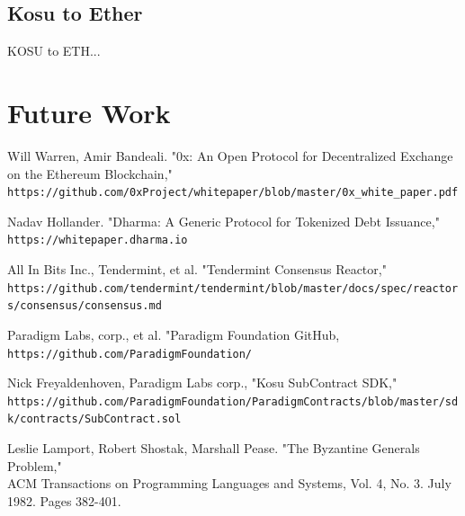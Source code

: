 \documentclass[10pt]{article}
\begin{document}
\subsection{Kosu to Ether}\label{token-distribution-kosu-eth}
KOSU to ETH...\cite{bft}
\clearpage
\pagebreak


\section{Future Work}\label{future-work}

\clearpage
\pagebreak


\begin{thebibliography}{9}

Will Warren, Amir Bandeali. "0x: An Open Protocol for Decentralized Exchange on the Ethereum Blockchain,"
\\\texttt{https://github.com/0xProject/whitepaper/blob/master/0x\_white\_paper.pdf}

Nadav Hollander. "Dharma: A Generic Protocol for Tokenized Debt Issuance,"
\\\texttt{https://whitepaper.dharma.io}

All In Bits Inc., Tendermint, et al. "Tendermint Consensus Reactor,"
\\\small\texttt{https://github.com/tendermint/tendermint/blob/master/docs/spec/reactors/consensus/consensus.md}

Paradigm Labs, corp., et al. "Paradigm Foundation GitHub,
\\\small\texttt{https://github.com/ParadigmFoundation/}

Nick Freyaldenhoven, Paradigm Labs corp., "Kosu SubContract SDK,"
\\\small\texttt{https://github.com/ParadigmFoundation/ParadigmContracts/blob/master/sdk/contracts/SubContract.sol}

Leslie Lamport, Robert Shostak, Marshall Pease. "The Byzantine Generals Problem,"
\\ACM Transactions on Programming Languages and Systems, Vol. 4, No. 3. July 1982. Pages 382-401.

\end{thebibliography}


\end{document}
